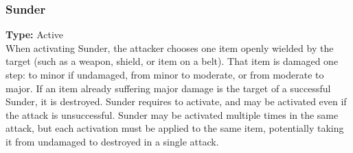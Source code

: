 \subsubsection{Sunder}
\label{iqty:sunder}
\textbf{Type:} Active\\
When activating Sunder, the attacker chooses one item
openly wielded by the target (such as a weapon, shield, or
item on a belt). That item is damaged one step: to minor
if undamaged, from minor to moderate, or from moderate
to major. If an item already suffering major damage is
the target of a successful Sunder, it is destroyed.
Sunder requires \advantage to activate, and may be activated
even if the attack is unsuccessful. Sunder may be activated
multiple times in the same attack, but each activation
must be applied to the same item, potentially taking
it from undamaged to destroyed in a single attack.
